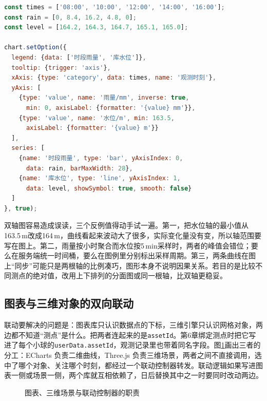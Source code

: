 \begin{lstlisting}[label={lst:ch07-rain-level-dualaxis},language=JavaScript,breaklines=true,caption={雨量倒挂柱与水位过程线的配置}]
const times = ['08:00', '10:00', '12:00', '14:00', '16:00'];
const rain = [0, 8.4, 16.2, 4.8, 0];
const level = [164.2, 164.3, 164.7, 165.1, 165.0];

chart.setOption({
  legend: {data: ['时段雨量', '库水位']},
  tooltip: {trigger: 'axis'},
  xAxis: {type: 'category', data: times, name: '观测时刻'},
  yAxis: [
    {type: 'value', name: '雨量/mm', inverse: true,
      min: 0, axisLabel: {formatter: '{value} mm'}},
    {type: 'value', name: '水位/m', min: 163.5,
      axisLabel: {formatter: '{value} m'}}
  ],
  series: [
    {name: '时段雨量', type: 'bar', yAxisIndex: 0,
      data: rain, barMaxWidth: 28},
    {name: '库水位', type: 'line', yAxisIndex: 1,
      data: level, showSymbol: true, smooth: false}
  ]
}, true);
\end{lstlisting}

双轴图容易造成误读，三个反例值得动手试一遍。第一，把水位轴的最小值从163.5\,m改成164\,m，曲线看起来波动大了很多，实际变化量没有变，所以轴范围要写在图上。第二，雨量按小时聚合而水位按5\,min采样时，两者的峰值会错位；要么在服务端统一时间桶，要么在图例里分别标出采样周期。第三，两条曲线在图上“同步”可能只是两根轴的比例凑巧，图形本身不说明因果关系。若目的是比较不同测点的绝对值，改用上下排列的分面图或同一根轴，比双轴更稳妥。

\subsection{图表与三维对象的双向联动}

联动要解决的问题是：图表库只认识数据点的下标，三维引擎只认识网格对象，两边都不知道“测点”是什么。把两者连起来的是\texttt{assetId}。第6章绑定测点时把它写进了每个小球的\texttt{userData.assetId}，观测记录里也带着同名字段。图\ref{fig:chart-technology-selection}画出三者的分工：ECharts 负责二维曲线，Three.js 负责三维场景，两者之间不直接调用，选中了哪个对象、关注哪个时刻，都经过一个联动控制器转发。联动逻辑如果写进图表一侧或场景一侧，两个库就互相依赖了，日后替换其中之一时要同时改动两边。

\begin{figure}[htbp]
\centering
{}
\caption{图表、三维场景与联动控制器的职责}
\label{fig:chart-technology-selection}
\end{figure}

